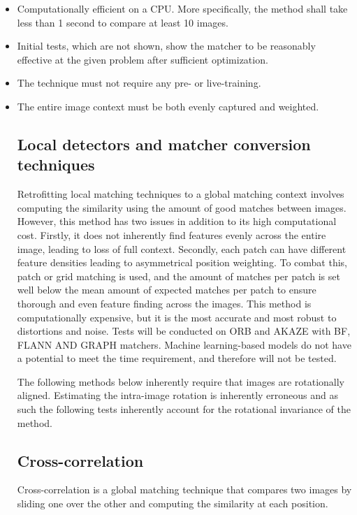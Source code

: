 \begin{itemize}
    \item Computationally efficient on a CPU. More specifically, the method shall take less than 1 second to compare at least 10 images. 
    \item Initial tests, which are not shown, show the matcher to be reasonably effective at the given problem after sufficient optimization.
    \item The technique must not require any pre- or live-training.
    \item The entire image context must be both evenly captured and weighted. 





\subsection*{Local detectors and matcher conversion techniques}
Retrofitting local matching techniques to a global matching context involves computing the similarity using the amount of good matches between images. However, this method has two issues in addition to its high computational cost. Firstly, it does not inherently find features evenly across the entire image, leading to loss of full context. Secondly, each patch can have different feature densities leading to asymmetrical position weighting. To combat this, patch or grid matching is used, and the amount of matches per patch is set well below the mean amount of expected matches per patch to ensure thorough and even feature finding across the images. This method is computationally expensive, but it is the most accurate and most robust to distortions and noise. Tests will be conducted on ORB and AKAZE with BF, FLANN AND GRAPH matchers. Machine learning-based models do not have a potential to meet the time requirement, and therefore will not be tested.

The following methods below inherently require that images are rotationally aligned. Estimating the intra-image rotation is inherently erroneous and as such the following tests inherently account for the rotational invariance of the method. 

\subsection*{Cross-correlation}
Cross-correlation is a global matching technique that compares two images by sliding one over the other and computing the similarity at each position. 


\end{itemize}
